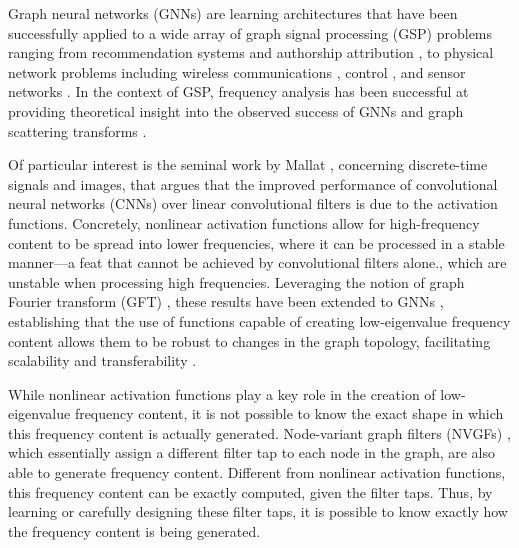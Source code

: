 

\noindent Graph neural networks (GNNs) \cite{Bronstein2017-GeometricDL, Gama2020-GNN} are learning architectures that have been successfully applied to a wide array of graph signal processing (GSP) problems ranging from recommendation systems \cite{Monti2017-RecommendationGNN, Levie2018-CayleyNets} and authorship attribution \cite{Segarra2015-Authorship, Gama2019-Archit}, to physical network problems including wireless communications \cite{Eisen2020-WirelessEGNN}, control \cite{Gama2021-LQRGNN}, and sensor networks \cite{Owerko2018-Sensor}. In the context of GSP, frequency analysis has been successful at providing theoretical insight into the observed success of GNNs \cite{Gama2020-Stability, Kenlay2021-StabilityRewiring, Levie2020-TransferabilitySpectral} and graph scattering transforms \cite{Wolf2019-GeometricScattering, Lerman2020-Scattering}.

Of particular interest is the seminal work by Mallat \cite{Mallat2012-Scattering, Bruna2013-Scattering}, concerning discrete-time signals and images, that argues that the improved performance of convolutional neural networks (CNNs) over linear convolutional filters is due to the activation functions. Concretely, nonlinear activation functions allow for high-frequency content to be spread into lower frequencies, where it can be processed in a stable manner---a feat that cannot be achieved by convolutional filters alone.\else, which are unstable when processing high frequencies.\fi
Leveraging the notion of graph Fourier transform (GFT) \cite{Sandryhaila2014-DSPGfreq}, these results have been extended to GNNs \cite{Gama2020-Stability}, establishing that the use of functions capable of creating low-eigenvalue frequency content allows them to be robust to changes in the graph topology, facilitating scalability and transferability \cite{Ruiz2021-GNNs}.

While nonlinear activation functions play a key role in the creation of low-eigenvalue frequency content, it is not possible to know the exact shape in which this frequency content is actually generated. Node-variant graph filters (NVGFs) \cite{Segarra2017-GraphFilterDesign}, which essentially assign a different filter tap to each node in the graph, are also able to generate frequency content. Different from nonlinear activation functions, this frequency content can be exactly computed, given the filter taps. Thus, by learning or carefully designing these filter taps, it is possible to know exactly how the frequency content is being generated.

